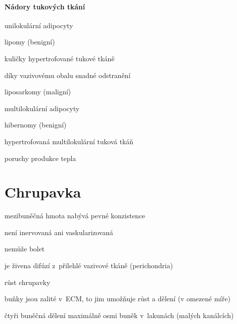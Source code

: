 \documentclass[DIV=8]{scrreprt}
\begin{document}
\paragraph{Nádory tukových tkání}
\begin{myItemize}[nosep]
    \item unilokulární adipocyty
\begin{myItemize}[nosep]
    \item lipomy (benigní)
\begin{myItemize}[nosep]
    \item kuličky hypertrofované tukové tkáně
    \item díky vazivovému obalu snadné odstranění
\end{myItemize}

    \item liposarkomy (maligní)
\end{myItemize}

    \item multilokulární adipocyty
\begin{myItemize}[nosep]
    \item hibernomy (benigní)
\begin{myItemize}[nosep]
    \item hypertrofovaná multilokulární tuková tkáň
    \item poruchy produkce tepla
\end{myItemize}

\end{myItemize}

\end{myItemize}



\section{Chrupavka} \label{Chrupavka} \FloatBarrier


\begin{myItemize}[nosep]
    \item mezibuněčná hmota nabývá pevné konzistence
    \item není inervovaná ani vaskularizovaná
\begin{myItemize}[nosep]
    \item nemůže bolet
    \item je živena difúzí z přilehlé vazivové tkáně (perichondria)
\end{myItemize}

    \item růst chrupavky
\begin{myItemize}[nosep]
    \item buňky jsou zalité v ECM, to jim umožňuje růst a dělení (v omezené míře)
\begin{myItemize}[nosep]
    \item čtyři buněčná dělení maximálně osmi buněk v lakunách (malých kanálcích)
\end{myItemize}

\end{myItemize}

\end{myItemize}
\end{document}
